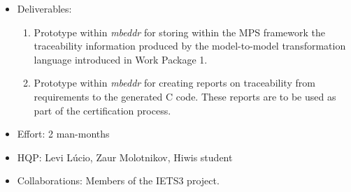 \begin{itemize}
  \item Deliverables:
  \begin{enumerate}
    \item Prototype within \emph{mbeddr} for storing within the MPS
    framework the traceability information produced by the model-to-model
    transformation language introduced in Work Package 1.
    \item Prototype within \emph{mbeddr} for creating reports on traceability
    from requirements to the generated C code. These reports are to be used as
    part of the certification process.
  \end{enumerate}
  \item Effort: 2 man-months
  \item HQP: Levi L\'ucio, Zaur Molotnikov, Hiwis student
  \item Collaborations: Members of the IETS3 project.
\end{itemize}
